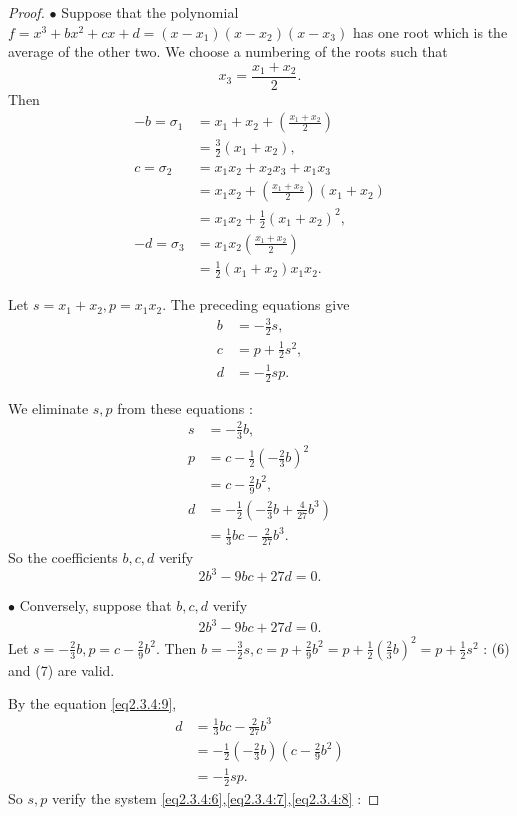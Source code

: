 \documentclass[11pt,a4paper]{article}
\begin{document}
\begin{proof}
$\bullet$ Suppose that the polynomial $ f = x^3 +bx^2+cx+d =(x-x_1)(x-x_2)(x-x_3)$ has one root which is the average of the other two. We choose a numbering of  the roots such that $$x_3 = \frac{x_1+x_2}{2}.$$
Then 
\begin{align*}
-b = \sigma_1 &= x_1+x_2 + \left(\frac{x_1+x_2}{2}\right)\\
&= \frac{3}{2}(x_1+x_2),\\
c = \sigma_2 &= x_1x_2+x_2x_3+x_1x_3\\
&=x_1x_2 +\left(\frac{x_1+x_2}{2}\right)(x_1+x_2)\\
&=x_1x_2 + \frac{1}{2}(x_1+x_2)^2,\\
-d = \sigma_3 &=x_1x_2\left(\frac{x_1+x_2}{2}\right)\\
&=\frac{1}{2}(x_1+x_2)x_1x_2.
\end{align*}

Let $s=x_1+x_2,p=x_1x_2$. The preceding equations give
\begin{align}
b &= -\frac{3}{2} s, \label{eq2.3.4:6}\\
c &= p +\frac{1}{2} s^2,\label{eq2.3.4:7}\\
d&=-\frac{1}{2} sp.\label{eq2.3.4:8}
\end{align}

We eliminate $s,p$ from these equations :
\begin{align*}
s &= -\frac{2}{3} b,\\
p &= c - \frac{1}{2}\left(-\frac{2}{3} b\right)^2\\
&=c - \frac{2}{9} b^2,\\
d&=-\frac{1}{2} \left(-\frac{2}{3} b + \frac{4}{27} b^3 \right)\\
&= \frac{1}{3}bc -\frac{2}{27} b^3.
\end{align*}
So the coefficients $b,c,d$ verify $$2b^3 - 9bc + 27d = 0.$$

\vspace{0.5cm}
$\bullet$ Conversely, suppose that $b,c,d$ verify 
\begin{align}
2b^3 - 9bc + 27d = 0.\label{eq2.3.4:9}
\end{align}
Let  $s =-\frac{2}{3} b, p = c - \frac{2}{9} b^2$. Then  $b = -\frac{3}{2} s, c = p +\frac{2}{9} b^2 = p + \frac{1}{2} (\frac{2}{3} b)^2 = p + \frac{1}{2} s^2$ : (6) and (7) are valid.

By the equation \eqref{eq2.3.4:9}, 
\begin{align*}
d &=  \frac{1}{3}bc -\frac{2}{27} b^3\\
&=-\frac{1}{2} \left ( -\frac{2}{3} b\right) \left (c - \frac{2}{9} b^2\right)\\
&= -\frac{1}{2} sp.
\end{align*}
So $s,p$ verify the system \eqref{eq2.3.4:6},\eqref{eq2.3.4:7},\eqref{eq2.3.4:8} :


\end{proof}
\end{document}
